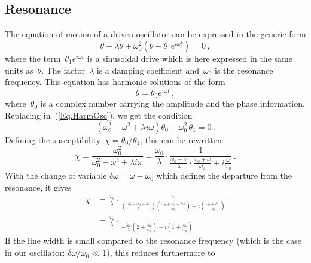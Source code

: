 \subsection{Resonance}
\label{sec.resonance}
The equation of motion of a driven oscillator can be expressed in the generic form
\begin{equation}
\ddot{\theta} + \lambda \dot{\theta} + \omega_0^2 (\theta -\theta_1 e^{i\omega t}) = 0 \,,
\label{Eq.HarmOsc}
\end{equation}
where the term~$\theta_1e^{i\omega t}$ is a sinusoidal drive which is here expressed in the same units as~$\theta$. The factor~$\lambda$ is a damping coefficient and~$\omega_0$ is the resonance frequency. This equation has harmonic solutions of the form
\begin{equation}
\theta=\theta_0 e^{i\omega t} \,,
\label{Eq.HarmonicSolution}
\end{equation}
where~$\theta_0$ is a complex number carrying the amplitude and the phase information. Replacing in~(\ref{Eq.HarmOsc}), we get the condition
\begin{equation}
\left(\omega_0^2 - \omega^2 + \lambda i \omega\right)\theta_0 - \omega_0^2\,\theta_1 = 0 \,.
\end{equation}
Defining the susceptibility~$\chi = \theta_0/\theta_1$, this can be rewritten
\begin{equation}
\chi = \frac{\omega_0^2}{\omega_0^2-\omega^2 + \lambda i \omega} =
\frac{\omega_0}{\lambda}\cdot \frac{1}{
\frac{\omega_0-\omega}{\lambda} \cdot
\frac{\omega_0+\omega}{\omega_0}+
i\frac{\omega}{\omega_0}} \,.
\label{Eq.Susceptibility}
\end{equation}
With the change of variable $\delta\omega = \omega - \omega_0$ which defines the departure from the resonance, it gives
\begin{equation}
	\begin{split}
	\chi & =  
		\frac{\omega_0}{\lambda}\cdot \frac{1}{
		\left(\frac{\omega_0-\omega_0 - \delta\omega}{\lambda}\right)
		\left(\frac{\omega_0+\omega_0 + \delta\omega}{\omega_0}\right)+
		i\left(\frac{\omega_0 + \delta\omega}{\omega_0}\right)}
	\\ & = 
		\frac{\omega_0}{\lambda}\cdot \frac{1}{
		-\frac{\delta\omega}{\lambda} \left(2 + \frac{\delta\omega}{\omega_0}\right) +
		i\left(1 + \frac{\delta\omega}{\omega_0}\right)} \,.
	\end{split}
\end{equation}
If the line width is small compared to the resonance frequency (which is the case in our oscillator: $\delta\omega/\omega_0\ll 1$), this reduces furthermore to
